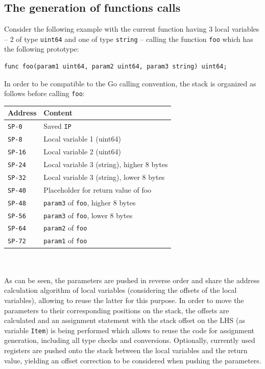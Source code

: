 \documentclass[a4paper]{scrartcl}
\let\section\subsection
\let\subsection\subsubsection
\let\subsubsection\paragraph
\let\paragraph\subparagraph
\let\subparagraph\undefined
\begin{document}
    \section{The generation of functions calls} \label{The generation of functions}
      Consider the following example with the current function having 3 local variables -- 2 of type \texttt{uint64} and one of type \texttt{string} -- calling the function \texttt{foo} which has the following prototype:
        \begin{lstlisting}
func foo(param1 uint64, param2 uint64, param3 string) uint64;
        \end{lstlisting}
      In order to be compatible to the Go calling convention, the stack is organized as follows before calling \texttt{foo}:
      \begin{table}[h!]
      \begin{tabular}{ll}
        \toprule
        \textbf{Address} & \textbf{Content}\\
        \midrule
        \texttt{SP-0} & Saved \texttt{IP}\\
        \texttt{SP-8} & Local variable 1 (uint64)\\
        \texttt{SP-16} & Local variable 2 (uint64)\\
        \texttt{SP-24} & Local variable 3 (string), higher 8 bytes\\
        \texttt{SP-32} & Local variable 3 (string), lower 8 bytes\\
        \midrule
        \texttt{SP-40} & Placeholder for return value of foo\\
        \texttt{SP-48} & \texttt{param3} of \texttt {foo}, higher 8 bytes\\
        \texttt{SP-56} & \texttt{param3} of \texttt {foo}, lower 8 bytes\\
        \texttt{SP-64} & \texttt{param2} of \texttt {foo}\\
        \texttt{SP-72} & \texttt{param1} of \texttt {foo}\\
        \bottomrule
      \end{tabular}
      \end{table}\\ \\
      As can be seen, the parameters are pushed in reverse order and share the address calculation algorithm of local variables (considering the offsets of the local variables), allowing to reuse the latter for this purpose. In order to move the parameters to their corresponding positions on the stack, the offsets are calculated and an assignment statement with the stack offset on the LHS (as variable \texttt{Item}) is being performed which allows to reuse the code for assignment generation, including all type checks and conversions. Optionally, currently used registers are pushed onto the stack between the local variables and the return value, yielding an offset correction to be considered when pushing the parameters.\\
\end{document}
